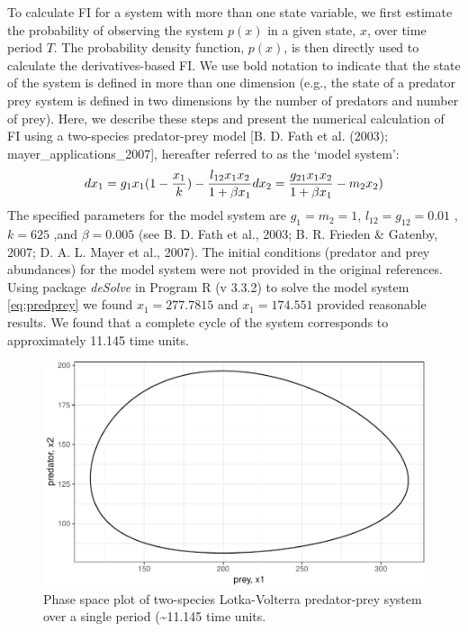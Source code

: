\documentclass[12pt,twoside,openany]{reedthesis}
\begin{document}
To calculate FI for a system with more than one state variable, we first
estimate the probability of observing the system \(p(x)\) in a given
state, \(x\), over time period \(T\). The probability density function,
\(p(x)\), is then directly used to calculate the derivatives-based FI.
We use bold notation to indicate that the state of the system is defined
in more than one dimension (e.g., the state of a predator prey system is
defined in two dimensions by the number of predators and number of
prey). Here, we describe these steps and present the numerical
calculation of FI using a two-species predator-prey model {[}B. D. Fath
et al. (2003); mayer\_applications\_2007{]}, hereafter referred to as
the `model system':
\begin{equation} 
  dx_1 = g_{1}x_{1}(1-\frac{x_1}{k})- \frac{l_{12} x_{1} x_{2}}{1+\beta x_{1}} \\
  dx_2 = \frac{g_{21}x_1 x_2}{1+\beta x_1} - m_2 x_2)
  \label{eq:predprey}
\end{equation}
The specified parameters for the model system are \(g_1=m_2=1\),
\(l_12=g_12 = 0.01\) , \(k=625\) ,and \(\beta=0.005\) (see B. D. Fath et
al., 2003; B. R. Frieden \& Gatenby, 2007; D. A. L. Mayer et al., 2007).
The initial conditions (predator and prey abundances) for the model
system were not provided in the original references. Using package
\emph{deSolve} in Program R (v 3.3.2) to solve the model system
\eqref{eq:predprey} we found \(x_1 = 277.7815\) and \(x_1= 174.551\)
provided reasonable results. We found that a complete cycle of the
system corresponds to approximately 11.145 time units.
\begin{figure}
\centering
\includegraphics{_myDissertation_files/figure-latex/pp1Period-1.pdf}
\caption{\label{fig:pp1Period}Phase space plot of two-species Lotka-Volterra
predator-prey system over a single period (\textasciitilde{}11.145 time
units.}
\end{figure}
\end{document}
